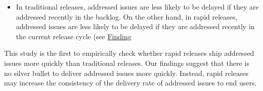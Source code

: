 \begin{itemize}
	\item In traditional releases, addressed issues are less likely to be
		delayed if they are addressed recently in the backlog. On the
		other hand, in rapid releases, addressed issues are less likely
		to be delayed if they are addressed recently in the current
		release cycle (see \DIFdelbegin %
\DIFdelend \DIFaddbegin \hyperref[find22]{Finding}\DIFaddend 

\end{itemize}

This study is the first to empirically check whether rapid releases ship
addressed issues more quickly than traditional releases. Our findings suggest
that there is no silver bullet to deliver addressed issues more quickly.
Instead, rapid releases may increase the consistency of the delivery rate of
addressed issues to end users.

